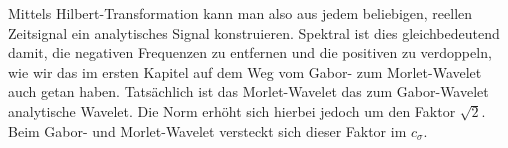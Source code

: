 Mittels Hilbert-Transformation kann man also aus jedem beliebigen, reellen Zeitsignal ein analytisches Signal konstruieren.
Spektral ist dies gleichbedeutend damit, die negativen Frequenzen zu entfernen und die positiven zu verdoppeln, wie wir das im ersten Kapitel auf dem Weg vom Gabor- zum Morlet-Wavelet auch getan haben.
Tatsächlich ist das Morlet-Wavelet das zum Gabor-Wavelet analytische Wavelet.
Die Norm erhöht sich hierbei jedoch um den Faktor $\sqrt{2}$.
Beim Gabor- und Morlet-Wavelet versteckt sich dieser Faktor im $c_\sigma$.
